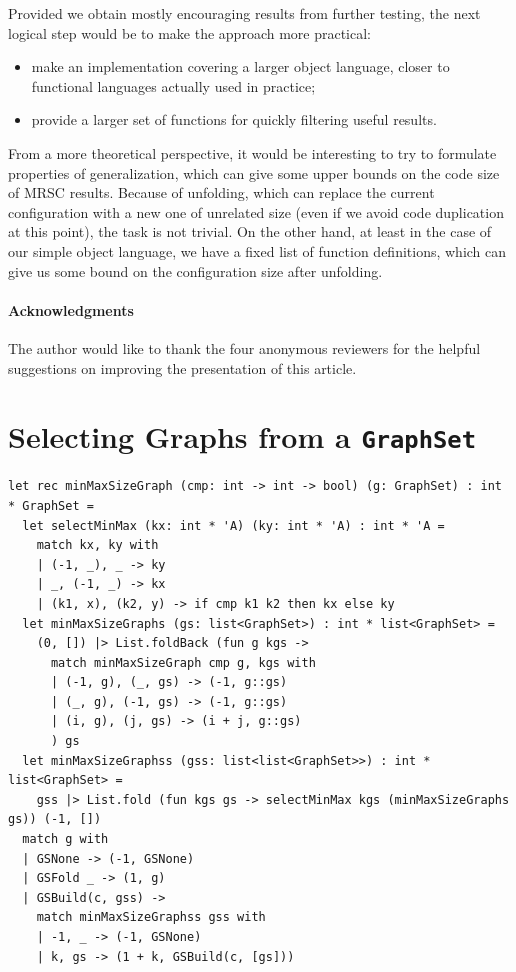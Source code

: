 \documentclass[submission,copyright,creativecommons]{eptcs}
\begin{document}
Provided we obtain mostly encouraging results from further testing, the next logical 
step would be to make the approach more practical:
\begin{itemize}
  \item make an implementation covering a larger object language, closer to functional languages
    actually used in practice;
  \item provide a larger set of functions for quickly filtering useful results.
\end{itemize}

From a more theoretical perspective, it would be interesting to try to formulate properties
of generalization, which can give some upper bounds on the code size of MRSC results.
Because of unfolding, which can replace the current configuration with a new one of unrelated size (even
if we avoid code duplication at this point), the task is not trivial.
On the other hand, at least in the case of our simple object language, we have a fixed
list of function definitions, which can give us some bound on the configuration size
after unfolding.

\paragraph{Acknowledgments}
The author would like to thank the four anonymous reviewers for
the helpful suggestions on improving the presentation of
this article.





\ifVptVer
\else

\appendix

\clearpage
\section{Selecting Graphs from a \texttt{GraphSet}}\label{app:FilterGraphSet}

\begin{lstlisting}[caption={Selecting a Graph of Minimum/Maximum Size from a Graph Set}]
let rec minMaxSizeGraph (cmp: int -> int -> bool) (g: GraphSet) : int * GraphSet =
  let selectMinMax (kx: int * 'A) (ky: int * 'A) : int * 'A =
    match kx, ky with
    | (-1, _), _ -> ky
    | _, (-1, _) -> kx
    | (k1, x), (k2, y) -> if cmp k1 k2 then kx else ky
  let minMaxSizeGraphs (gs: list<GraphSet>) : int * list<GraphSet> =
    (0, []) |> List.foldBack (fun g kgs -> 
      match minMaxSizeGraph cmp g, kgs with
      | (-1, g), (_, gs) -> (-1, g::gs)
      | (_, g), (-1, gs) -> (-1, g::gs)
      | (i, g), (j, gs) -> (i + j, g::gs)
      ) gs
  let minMaxSizeGraphss (gss: list<list<GraphSet>>) : int * list<GraphSet> =
    gss |> List.fold (fun kgs gs -> selectMinMax kgs (minMaxSizeGraphs gs)) (-1, [])
  match g with
  | GSNone -> (-1, GSNone)
  | GSFold _ -> (1, g)
  | GSBuild(c, gss) -> 
    match minMaxSizeGraphss gss with
    | -1, _ -> (-1, GSNone)
    | k, gs -> (1 + k, GSBuild(c, [gs]))
\end{lstlisting}
\end{document}
